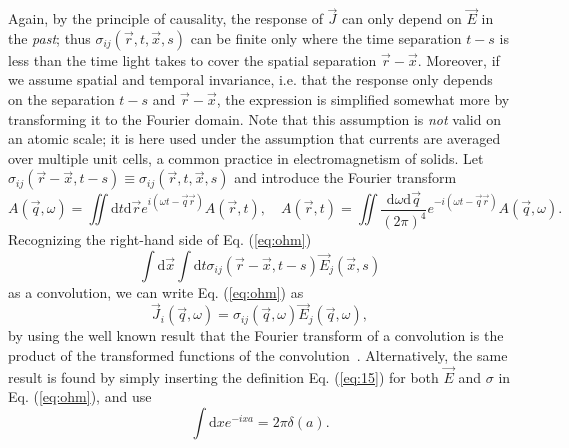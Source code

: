 Again, by the principle of causality, the response of $\vec{J}$ can only depend on $\vec{E}$ in the \emph{past};
thus $\sigma_{ij}(\vec{r}, t, \vec{x}, s)$ can be finite only where the time separation $t-s$ is less than the time light takes to cover the spatial separation $\vec{r} - \vec{x}$.
Moreover, if we assume spatial and temporal invariance, i.e. that the response only depends on the separation $t-s$ and $\vec{r} - \vec{x}$, the expression is simplified somewhat more by transforming it to the Fourier domain.
Note that this assumption is \emph{not} valid on an atomic scale;
it is here used under the assumption that currents are averaged over multiple unit cells, a common practice in electromagnetism of solids.
Let $\sigma_{ij}(\vec{r} - \vec{x}, t-s) \equiv \sigma_{ij}(\vec{r}, t, \vec{x}, s)$ and introduce the Fourier transform
\begin{equation}
  \label{eq:15}
  A(\vec{q}, \omega ) =
  \iint \mathrm{d}t \mathrm{d} \vec{r}
  e^{i(\omega  t - \vec{q} \vec{r} )}
  A(\vec{r}, t),
  \quad
  A(\vec{r}, t) =
  \iint 
  \frac{\mathrm{d}\omega  \mathrm{d} \vec{q}}{(2\pi )^4}
  e^{-i(\omega  t - \vec{q} \vec{r} )}
  A(\vec{q}, \omega).
\end{equation}
Recognizing the right-hand side of Eq. (\ref{eq:ohm})
\begin{equation}
  \int \mathrm{d} \vec{x} \int \mathrm{d} t
  \sigma _{ij} (\vec{r}-\vec{x}, t-s ) \vec{E}_{j}(\vec{x}, s)
\end{equation}
as a convolution, we can write Eq. (\ref{eq:ohm}) as
\begin{equation}
\label{eq:ohm-fourier}
  \vec{J}_i(\vec{q}, \omega) =
  \sigma_{ij}(\vec{q}, \omega)
  \vec{E}_j(\vec{q}, \omega),
\end{equation}
by using the well known result that the Fourier transform of a convolution is the product of the transformed functions of the convolution~\cite{rottmannMatematiskFormelsamling1995}.
Alternatively, the same result is found by simply inserting the definition Eq. (\ref{eq:15}) for both $\vec{E}$ and $\sigma $ in Eq. (\ref{eq:ohm}), and use
\[
\int \mathrm{d} x e^{-i x a} = 2\pi \delta (a).
  \]

